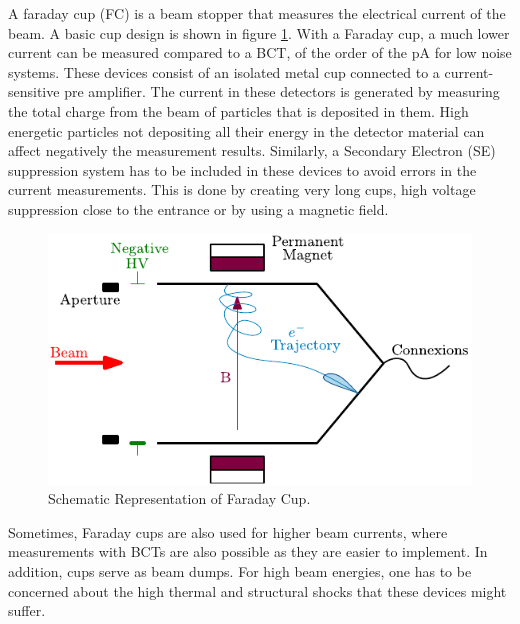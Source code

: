 A faraday cup (FC) is a beam stopper that measures the electrical current of the beam. A basic cup design is shown in figure \ref{fig:FaradayCup}. With a Faraday cup, a much lower current can be measured compared to a BCT, of the order of the \si[]{\pico \ampere} for low noise systems. These devices consist of an isolated metal cup connected to a current-sensitive pre amplifier. The current in these detectors is generated by measuring the total charge from the beam of particles that is deposited in them. High energetic particles not depositing all their energy in the detector material can affect negatively the measurement results. Similarly, a Secondary Electron (SE) suppression system has to be included in these devices to avoid errors in the current measurements. This is done by creating very long cups, high voltage suppression close to the entrance or by using a magnetic field. 

\begin{figure}[h]
    \centering
    \includegraphics[width=0.6\columnwidth]{FCschema/FCschema.pdf}
    \caption{Schematic Representation of Faraday Cup. }
    \label{fig:FaradayCup}
\end{figure}

Sometimes, Faraday cups are also used for higher beam currents, where measurements with BCTs are also possible as they are easier to implement. In addition, cups serve as beam dumps. For high beam energies, one has to be concerned about the high thermal and structural shocks that these devices might suffer.

